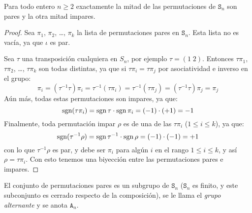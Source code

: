   \begin{theorem}
    Para todo entero \(n \ge 2\)
    exactamente la mitad
    de las permutaciones de \(\mathtt{S}_n\) son pares
    y la otra mitad impares.
  \end{theorem}
  \begin{proof}
    Sea \(\pi_1\), \(\pi_2\), \ldots, \(\pi_k\)
    la lista de permutaciones pares
    en \(\mathtt{S}_n\).
    Esta lista no es vacía,
    ya que \(\iota\) es par.

    Sea \(\tau\) una transposición cualquiera en \(S_n\),
    por ejemplo \(\tau = (1\;2)\).
    Entonces \(\tau \pi_1\), \(\tau \pi_2\), \ldots, \(\tau \pi_k\)
    son todas distintas,
    ya que si \(\tau \pi_i = \tau \pi_j\)
    por asociatividad e inverso en el grupo:
    \begin{equation*}
      \pi_i = (\tau^{-1} \tau) \pi_i
	    = \tau^{-1} (\tau \pi_i)
	    = \tau^{-1} (\tau \pi_j)
	    = (\tau^{-1} \tau) \pi_j
	    = \pi_j
    \end{equation*}
    Aún más,
    todas estas permutaciones son impares,
    ya que:
    \begin{equation*}
      \operatorname{sgn} (\tau \pi_i)
	 = \operatorname{sgn} \tau \cdot \operatorname{sgn} \pi_i
	 = (-1) \cdot (+1)
	 = -1
    \end{equation*}
    Finalmente,
    toda permutación impar \(\rho\)
    es de una de las \(\tau \pi_i\) (\(1 \le i \le k\)),
    ya que:
    \begin{equation*}
      \operatorname{sgn} (\tau^{-1} \rho)
	 = \operatorname{sgn} \tau^{-1} \cdot \operatorname{sgn} \rho
	 = (-1) \cdot (-1)
	 = +1
    \end{equation*}
    con lo que \(\tau^{-1} \rho\) es par,
    y debe ser \(\pi_i\)
    para algún \(i\) en el rango \(1 \le i \le k\),
    y así \(\rho = \tau \pi_i\).
    Con esto tenemos una biyección
    entre las permutaciones pares e impares.
  \end{proof}
  El conjunto de permutaciones pares
  es un subgrupo de \(\mathtt{S}_n\)
  (\(\mathtt{S}_n\) es finito,
   y este subconjunto es cerrado respecto de la composición),
  se le llama el \emph{grupo alternante}
  y se anota \(\mathtt{A}_n\).%

